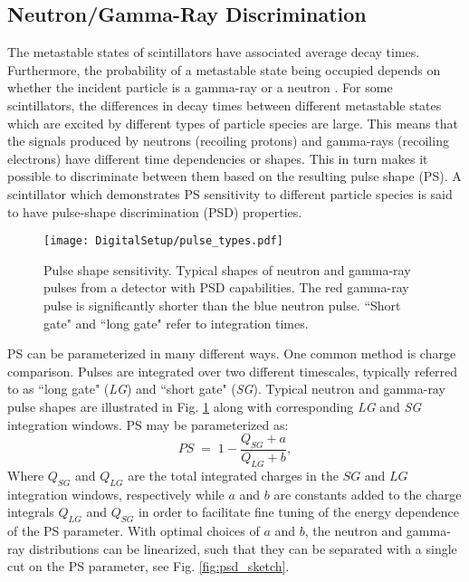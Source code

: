 \documentclass[main.tex]{subfiles}
\begin{document}
\subsection{Neutron/Gamma-Ray Discrimination}\label{sec:psd}
The metastable states of scintillators have associated average decay times. 
Furthermore, the probability of a metastable state being occupied depends on whether the incident particle is a gamma-ray or a neutron \cite{Krane}. For some scintillators, the differences in decay times between different metastable states which are excited by different types of particle species are large. This means that the signals produced by neutrons (recoiling protons) and gamma-rays (recoiling electrons) have different time dependencies or shapes. This in turn makes it possible to discriminate between them based on the resulting pulse shape (PS). A scintillator which demonstrates PS sensitivity to different particle species is said to have pulse-shape discrimination (PSD) properties.
\begin{figure}[ht]
	\centering
    	\texttt{[image: DigitalSetup/pulse\_types.pdf]}
        \caption[Pulse shape sensitivity.]{Pulse shape sensitivity. Typical shapes of neutron and gamma-ray pulses from a detector with PSD capabilities. The red gamma-ray pulse is significantly shorter than the blue neutron pulse. ``Short gate" and ``long gate" refer to integration times.}
	    \label{fig:pulse_types} 
\end{figure}

PS can be parameterized in many different ways. One common method is charge comparison. Pulses are integrated over two different timescales, typically referred to as ``long gate" (\textit{LG}) and ``short gate" (\textit{SG}). Typical neutron and gamma-ray pulse shapes are illustrated in Fig. \ref{fig:pulse_types} along with corresponding \textit{LG} and \textit{SG} integration windows. PS may be parameterized as:
\begin{equation}
	PS \; = \; 1-\frac{Q_{SG} + a}{Q_{LG} + b},
	\label{eq:ps}
\end{equation}
Where $Q_{SG}$ and $Q_{LG}$ are the total integrated charges in the $SG$ and $LG$ integration windows, respectively while $a$ and $b$ are constants added to the charge integrals $Q_{LG}$ and $Q_{SG}$ in order to facilitate fine tuning of the energy dependence of the PS parameter. 
With optimal choices of $a$ and $b$, the neutron and gamma-ray distributions can be linearized, such that they can be separated with a single cut on the PS parameter, see Fig. \ref{fig:psd_sketch}.
\end{document}
